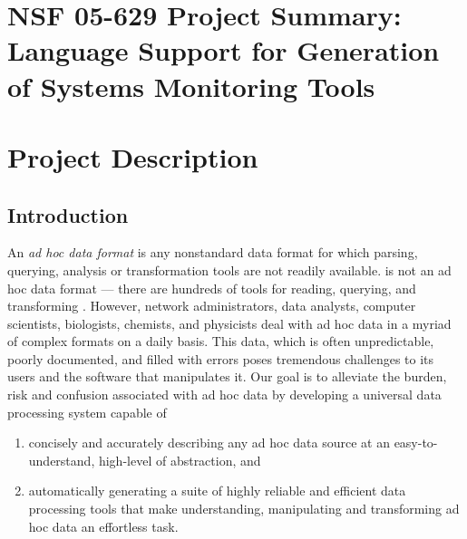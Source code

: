 \documentclass[11pt]{article}
\begin{document}
\setcounter{page}{1}
\appendix
\section{NSF 05-629 Project Summary:  \\
Language Support for Generation of Systems Monitoring Tools}

\newpage
\setcounter{page}{1}
\section{Project Description}

\subsection{Introduction}
\label{ssec:intro}

An {\em ad hoc data format} is any nonstandard data format for which
parsing, querying, analysis or transformation tools are not readily
available.  \xml{} is not an ad hoc data format --- there are hundreds
of tools for reading, querying, and transforming \xml{}.  However,
network administrators,
data analysts, computer scientists,
biologists, chemists, and physicists deal with ad hoc
data in a myriad of complex formats on a daily basis.
This data, which is often unpredictable, poorly documented,
and filled with errors
poses tremendous challenges to its users and the software
that manipulates it.  
Our goal is to alleviate the burden, risk and confusion associated
with ad hoc data by developing a universal data processing system
capable of 

\begin{enumerate}
\item concisely and accurately describing any ad hoc data source at an 
easy-to-understand, high-level of abstraction, and
\item automatically generating a suite of highly reliable and
efficient data processing tools that make understanding, manipulating 
and transforming ad hoc data an effortless task.
\end{enumerate}
\end{document}
